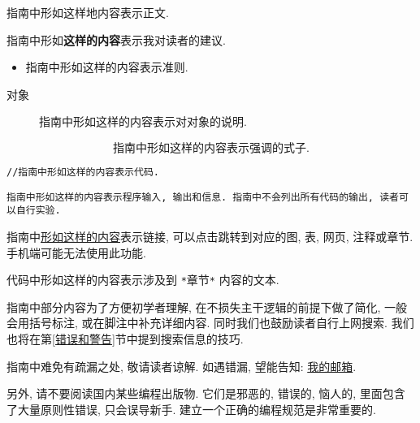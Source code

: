     \vspace*{5pt}
    指南中形如这样地内容表示正文. 

    \vspace*{5pt}
    指南中形如\textbf{这样的内容}表示我对读者的建议.

    \begin{itemize}
        \item 指南中形如这样的内容表示准则.
    \end{itemize}

    \begin{description}
        \item[对象] 指南中形如这样的内容表示对对象的说明. 
    \end{description}

    \vspace*{-20pt}
        \[ \mbox{指南中形如这样的内容表示强调的式子.} \]

\begin{lstlisting}
//指南中形如这样的内容表示代码.
\end{lstlisting}

\begin{lstlisting}
指南中形如这样的内容表示程序输入, 输出和信息. 指南中不会列出所有代码的输出, 读者可以自行实验.
\end{lstlisting}

    \vspace*{5pt}
    指南中\href{https://www.baidu.com}{形如这样的内容}表示链接, 可以点击跳转到对应的图, 表, 网页, 注释或章节. 手机端可能无法使用此功能.

    \begin{mdframed}[linecolor=darkgray]
        代码中形如这样的内容表示涉及到 \texttt{*}章节\texttt{*} 内容的文本.
    \end{mdframed}

    指南中部分内容为了方便初学者理解, 在不损失主干逻辑的前提下做了简化, 一般会用括号标注, 或在脚注中补充详细内容. 同时我们也鼓励读者自行上网搜索. 我们也将在第\ref{错误和警告}节中提到搜索信息的技巧.

    指南中难免有疏漏之处, 敬请读者谅解. 如遇错漏, 望能告知: \href{mailto: wutong.tony@foxmail.com}{我的邮箱}.

    另外, 请不要阅读国内某些编程出版物. 它们是邪恶的, 错误的, 恼人的, 里面包含了大量原则性错误, 只会误导新手. 建立一个正确的编程规范是非常重要的.